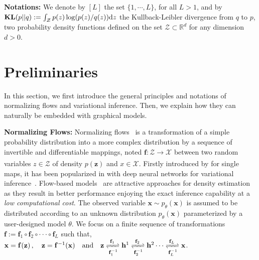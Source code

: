 \documentclass[twoside]{article}
\begin{document}
 \textbf{Notations:} We denote by $[L]$ the set $ \{1, \cdots, L\}$, for all $L >1$, and by $\textbf{\text{KL}}(p || q ) := \int_{\mathcal{Z}} p(z) \log(p(z)/q(z)) \mathrm{d}z$ the Kullback-Leibler divergence from $q$ to $p$, two probability density functions defined on the set $\mathcal{Z} \subset \mathbb{R}^d$ for any dimension $d >0$.


\section{Preliminaries}\label{sec:prelim}

In this section, we first introduce the general principles and notations of normalizing flows and variational inference. 
Then, we explain how they can naturally be embedded with graphical models.

\vspace{0.08in}
\textbf{Normalizing Flows:}
Normalizing flows~\cite{kingma2018glow,rezende2015variational} is a transformation of a simple probability distribution into a more complex distribution by a sequence of invertible and differentiable mappings, noted $\mathbf{f}: \mathcal{Z} \xrightarrow[]{} \mathcal{X}$ between two random variables $z \in \mathcal{Z}$ of density $p(\mathbf{z})$ and $x \in \mathcal{X}$. 
Firstly introduced by \cite{tabak2010density} for single maps, it has been popularized in \cite{Dinh2016DensityEU,rippel2013high} with deep neural networks for variational inference~\cite{rezende2015variational}. 
Flow-based models~\cite{Dinh2016DensityEU, dinh2014nice, de2020block, ho2019flow++,papamakarios2019normalizing} are attractive approaches for density estimation as they result in better performance enjoying the exact inference capability at a \emph{low computational cost}.
The observed variable $\mathbf{x} \sim p_\theta(\mathbf{x})$ is assumed to be distributed according to an unknown distribution $p_\theta(\mathbf{x})$ parameterized by a user-designed model $\theta$. 
We focus on a finite sequence of transformations $\mathbf{f}:=\mathbf{f}_1  \circ \mathbf{f}_2 \circ   \cdot  \cdot \cdot     \circ   \mathbf{f}_L$ such that, $\mathbf{x}=\mathbf{f}(\mathbf{z})\, , \quad \mathbf{z}=\mathbf{f}^{-1}(\mathbf{x}) \quad \textrm{and} \quad
    \mathbf{z} \xrightleftharpoons[\mathbf{f}_1^{-1}]{\mathbf{f}_1} \mathbf{h}^1 \xrightleftharpoons[\mathbf{f}_2^{-1}]{\mathbf{f}_2} \mathbf{h}^2 \cdots \xrightleftharpoons[\mathbf{f}_L^{-1}]{\mathbf{f}_L}\mathbf{x}$.
\end{document}
